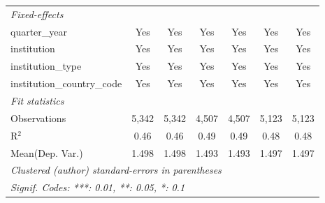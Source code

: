 \begin{tabular}{lcccccc}
   \midrule
   \emph{Fixed-effects}\\
   quarter\_year                      & Yes     & Yes         & Yes     & Yes          & Yes     & Yes\\  
   institution                        & Yes     & Yes         & Yes     & Yes          & Yes     & Yes\\  
   institution\_type                  & Yes     & Yes         & Yes     & Yes          & Yes     & Yes\\  
   institution\_country\_code         & Yes     & Yes         & Yes     & Yes          & Yes     & Yes\\  
   \midrule
   \emph{Fit statistics}\\
   Observations                       & 5,342   & 5,342       & 4,507   & 4,507        & 5,123   & 5,123\\  
   R$^2$                              & 0.46    & 0.46        & 0.49    & 0.49         & 0.48    & 0.48\\  
Mean(Dep. Var.) & 1.498 & 1.498 & 1.493 & 1.493 & 1.497 & 1.497 \\
   \midrule \midrule
   \multicolumn{7}{l}{\emph{Clustered (author) standard-errors in parentheses}}\\
   \multicolumn{7}{l}{\emph{Signif. Codes: ***: 0.01, **: 0.05, *: 0.1}}\\
\end{tabular}
\par\endgroup
